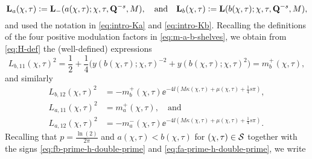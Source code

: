 \begin{equation}
\mathbf{L}_a(\chi,\tau) \vcentcolon=  \mathbf{L}_-(a(\chi,\tau);\chi,\tau,\mathbf{Q}^{-s},M), \quad \text{and}\quad \mathbf{L}_b(\chi,\tau) \vcentcolon=  \mathbf{L}(b(\chi,\tau);\chi,\tau,\mathbf{Q}^{-s},M),
\end{equation}
and used the notation in \eqref{eq:intro-Ka} and \eqref{eq:intro-Kb}. Recalling the definitions of the four positive modulation factors in \eqref{eq:m-a-b-shelves}, we obtain from \eqref{eq:H-def} the (well-defined) expressions
\begin{equation}
L_{b,11}(\chi,\tau)^2 = \frac{1}{2} + \frac{1}{4} \big( y(b(\chi,\tau);\chi,\tau)^{-2} + y(b(\chi,\tau);\chi,\tau)^{2} \big)
=m^+_b(\chi,\tau),
\label{eq:H-b-11}
\end{equation}
and similarly
\begin{align}
L_{b,12}(\chi,\tau)^2 
&= - m^+_b(\chi,\tau) \ee^{-4\ii (M\kappa(\chi,\tau)+ \mu(\chi,\tau) + \frac{1}{4}s \pi )},
\label{eq:H-b-12}\\
L_{a,11}(\chi,\tau)^2 &=
m^+_a(\chi,\tau),\quad\text{and}
\label{eq:H-a-11}\\
L_{a,12}(\chi,\tau)^2 &= - m^-_a(\chi,\tau) \ee^{-4\ii(M\kappa(\chi,\tau)+ \mu(\chi,\tau) + \frac{1}{4}s \pi )}.\label{eq:H-a-12}
\end{align}
Recalling that $p=\tfrac{\ln(2)}{2\pi}$ and $a(\chi,\tau)<b(\chi,\tau)$ for $(\chi,\tau) \in \mathcal{S}$ together with the signs \eqref{eq:fb-prime-h-double-prime} and \eqref{eq:fa-prime-h-double-prime}, we write
